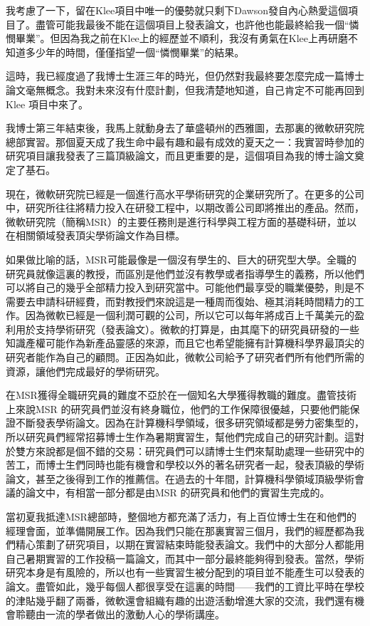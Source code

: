 \documentclass[12pt,UTF8,nofonts]{book}
\begin{document}
我考慮了一下，留在Klee項目中唯一的優勢就只剩下Dawson發自內心熱愛這個項目了。盡管可能我最後不能在這個項目上發表論文，也許他也能最終給我一個“憐憫畢業”。但因為我之前在Klee上的經歷並不順利，我沒有勇氣在Klee上再研磨不知道多少年的時間，僅僅指望一個“憐憫畢業”的結果。

這時，我已經度過了我博士生涯三年的時光，但仍然對我最終要怎麼完成一篇博士論文毫無概念。我對未來沒有什麼計劃，但我清楚地知道，自己肯定不可能再回到Klee 項目中來了。


我博士第三年結束後，我馬上就動身去了華盛頓州的西雅圖，去那裏的微軟研究院總部實習。那個夏天成了我生命中最有趣和最有成效的夏天之一：我實習時參加的研究項目讓我發表了三篇頂級論文，而且更重要的是，這個項目為我的博士論文奠定了基石。

現在，微軟研究院已經是一個進行高水平學術研究的企業研究所了。在更多的公司中，研究所往往將精力投入在研發工程中，以期改善公司即將推出的產品。然而，微軟研究院（簡稱MSR）的主要任務則是進行科學與工程方面的基礎科研，並以在相關領域發表頂尖學術論文作為目標。

如果做比喻的話，MSR可能最像是一個沒有學生的、巨大的研究型大學。全職的研究員就像這裏的教授，而區別是他們並沒有教學或者指導學生的義務，所以他們可以將自己的幾乎全部精力投入到研究當中。可能他們最享受的職業優勢，則是不需要去申請科研經費，而對教授們來說這是一種周而復始、極其消耗時間精力的工作。因為微軟已經是一個利潤可觀的公司，所以它可以每年將成百上千萬美元的盈利用於支持學術研究（發表論文）。微軟的打算是，由其麾下的研究員研發的一些知識產權可能作為新產品靈感的來源，而且它也希望能擁有計算機科學界最頂尖的研究者能作為自己的顧問。正因為如此，微軟公司給予了研究者們所有他們所需的資源，讓他們完成最好的學術研究。

在MSR獲得全職研究員的難度不亞於在一個知名大學獲得教職的難度。盡管技術上來說MSR 的研究員們並沒有終身職位，他們的工作保障很優越，只要他們能保證不斷發表學術論文。因為在計算機科學領域，很多研究領域都是勞力密集型的，所以研究員們經常招募博士生作為暑期實習生，幫他們完成自己的研究計劃。這對於雙方來說都是個不錯的交易：研究員們可以請博士生們來幫助處理一些研究中的苦工，而博士生們同時也能有機會和學校以外的著名研究者一起，發表頂級的學術論文，甚至之後得到工作的推薦信。在過去的十年間，計算機科學領域頂級學術會議的論文中，有相當一部分都是由MSR 的研究員和他們的實習生完成的。

當初夏我抵達MSR總部時，整個地方都充滿了活力，有上百位博士生在和他們的經理會面，並準備開展工作。因為我們只能在那裏實習三個月，我們的經歷都為我們精心策劃了研究項目，以期在實習結束時能發表論文。我們中的大部分人都能用自己暑期實習的工作投稿一篇論文，而其中一部分最終能夠得到發表。當然，學術研究本身是有風險的，所以也有一些實習生被分配到的項目並不能產生可以發表的論文。盡管如此，幾乎每個人都很享受在這裏的時間——我們的工資比平時在學校的津貼幾乎翻了兩番，微軟還會組織有趣的出遊活動增進大家的交流，我們還有機會聆聽由一流的學者做出的激動人心的學術講座。
\end{document}
